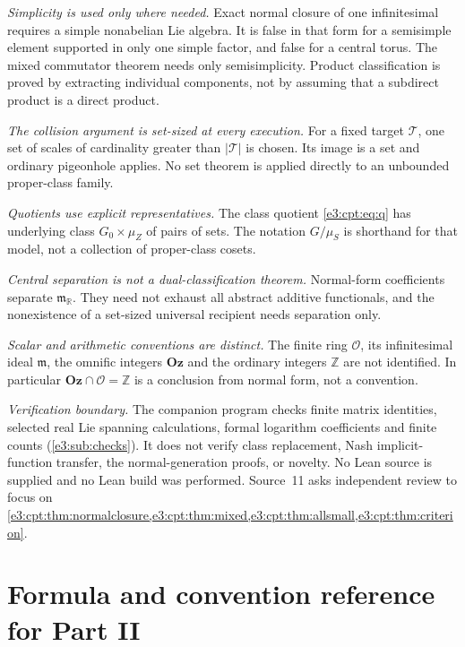\documentclass[11pt,letterpaper]{article}
\numberwithin{equation}{section}
\theoremstyle{definition}
\theoremstyle{remark}
\newcommand{\R}{\mathbb R}
\newcommand{\Z}{\mathbb Z}
\newcommand{\OO}{\mathcal O}
\newcommand{\mm}{\mathfrak m}
\newcommand{\Oz}{\mathbf{Oz}}
\begin{document}
\emph{Simplicity is used only where needed.} Exact normal closure of one
infinitesimal requires a simple nonabelian Lie algebra. It is false in that form
for a semisimple element supported in only one simple factor, and false for a
central torus. The mixed commutator theorem needs only semisimplicity. Product
classification is proved by extracting individual components, not by assuming
that a subdirect product is a direct product.

\emph{The collision argument is set-sized at every execution.} For a fixed
target $\mathcal T$, one set of scales of cardinality greater than
$|\mathcal T|$ is chosen. Its image is a set and ordinary pigeonhole applies. No
set theorem is applied directly to an unbounded proper-class family.

\emph{Quotients use explicit representatives.} The class quotient
\cref{e3:cpt:eq:q} has underlying class $G_0\times\mu_Z$ of pairs of sets. The
notation $G/\mu_S$ is shorthand for that model, not a collection of proper-class
cosets.

\emph{Central separation is not a dual-classification theorem.} Normal-form
coefficients separate $\mm_{\R}$. They need not exhaust all abstract additive
functionals, and the nonexistence of a set-sized universal recipient needs
separation only.

\emph{Scalar and arithmetic conventions are distinct.} The finite ring $\OO$,
its infinitesimal ideal $\mm$, the omnific integers $\Oz$ and the ordinary
integers $\Z$ are not identified. In particular $\Oz\cap\OO=\Z$ is a conclusion
from normal form, not a convention.

\emph{Verification boundary.} The companion program checks finite matrix
identities, selected real Lie spanning calculations, formal logarithm
coefficients and finite counts (\cref{e3:sub:checks}). It does not verify class
replacement, Nash implicit-function transfer, the normal-generation proofs, or
novelty. No Lean source is supplied and no Lean build was performed. Source~11
asks independent review to focus on
\cref{e3:cpt:thm:normalclosure,e3:cpt:thm:mixed,e3:cpt:thm:allsmall,e3:cpt:thm:criterion}.

\appendix
\section{Formula and convention reference for Part II}\label{e3:so:app:formulas}
\end{document}
